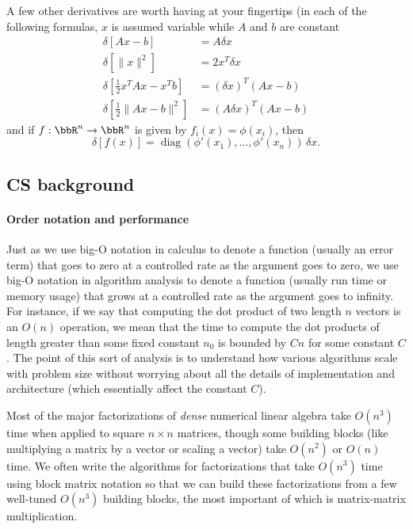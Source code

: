 \documentclass[12pt, leqno]{article}
\begin{document}
A few other derivatives are worth having at your fingertips
(in each of the following formulas, $x$ is assumed variable
while $A$ and $b$ are constant
\begin{align*}
  \delta [Ax-b] &= A \delta x \\
  \delta [\|x\|^2] &= 2 x^T \delta x \\
  \delta \left[\frac{1}{2} x^T A x - x^T b\right] &= (\delta x)^T (Ax-b) \\
  \delta \left[\frac{1}{2} \|Ax-b\|^2 \right] &= (A \delta x)^T (Ax-b)
\end{align*}
and if $f : \bbR^n \rightarrow \bbR^n$ is given by $f_i(x) = \phi(x_i)$,
then
\[
  \delta [f(x)] = \operatorname{diag}(\phi'(x_1), \ldots, \phi'(x_n))
  \, \delta x.
\]


\subsection{CS background}

\paragraph{Order notation and performance}
Just as we use big-O notation in calculus to denote a function
(usually an error term) that goes to zero at a controlled rate as the
argument goes to zero, we use big-O notation in algorithm analysis to
denote a function (usually run time or memory usage) that grows at a
controlled rate as the argument goes to infinity.  For instance,
if we say that computing the dot product of two length $n$ vectors
is an $O(n)$ operation, we mean that the time to compute the dot
products of length greater than some fixed constant $n_0$ is bounded
by $C n$ for some constant $C$.  The point of this sort of analysis
is to understand how various algorithms scale with problem size
without worrying about all the details of implementation and
architecture (which essentially affect the constant $C$).

Most of the major factorizations of {\em dense} numerical linear
algebra take $O(n^3)$ time when applied to square $n \times n$
matrices, though some building blocks (like multiplying a matrix
by a vector or scaling a vector) take $O(n^2)$ or $O(n)$ time.
We often write the algorithms for factorizations that take $O(n^3)$
time using block matrix notation so that we can build these
factorizations from a few well-tuned $O(n^3)$ building blocks,
the most important of which is matrix-matrix multiplication.
\end{document}
